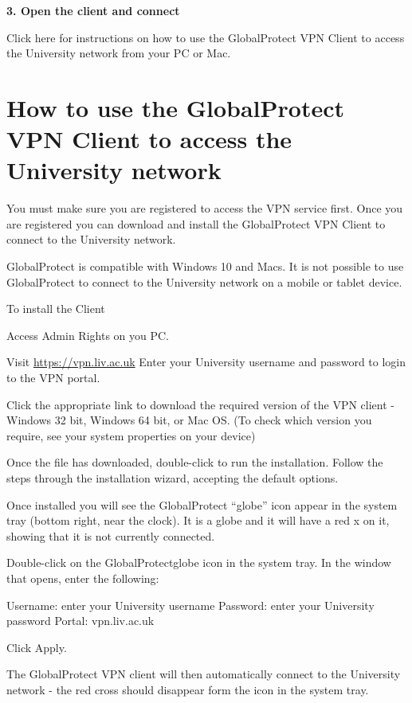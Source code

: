 \documentclass[
]{book}
\begin{document}
\textbf{3. Open the client and connect}

Click here for instructions on how to use the GlobalProtect VPN Client to access the University network from your PC or Mac.

\hypertarget{how-to-use-the-globalprotect-vpn-client-to-access-the-university-network}{%
\section{How to use the GlobalProtect VPN Client to access the University network}\label{how-to-use-the-globalprotect-vpn-client-to-access-the-university-network}}

You must make sure you are registered to access the VPN service first. Once you are registered you can download and install the GlobalProtect VPN Client to connect to the University network.

GlobalProtect is compatible with Windows 10 and Macs. It is not possible to use GlobalProtect to connect to the University network on a mobile or tablet device.

To install the Client

Access Admin Rights on you PC.

Visit \url{https://vpn.liv.ac.uk}
Enter your University username and password to login to the VPN portal.

Click the appropriate link to download the required version of the VPN client - Windows 32 bit, Windows 64 bit, or Mac OS. (To check which version you require, see your system properties on your device)

Once the file has downloaded, double-click to run the installation. Follow the steps through the installation wizard, accepting the default options.

Once installed you will see the GlobalProtect ``globe'' icon appear in the system tray (bottom right, near the clock). It is a globe and it will have a red x on it, showing that it is not currently connected.

Double-click on the GlobalProtectglobe icon in the system tray. In the window that opens, enter the following:

Username: enter your University username
Password: enter your University password
Portal: vpn.liv.ac.uk

Click Apply.

The GlobalProtect VPN client will then automatically connect to the University network - the red cross should disappear form the icon in the system tray.
\end{document}
